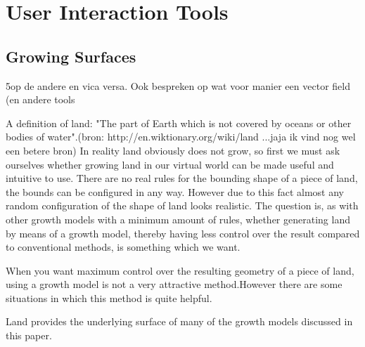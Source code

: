 \documentclass{article}
\newcommand{\inhoud}[1]{\textcolor{blue}{\textbf{\newline Summary: }\it{#1}}}
\begin{document}
\section{User Interaction Tools}

\subsection{Growing Surfaces}

5op de andere en vica versa. Ook bespreken op wat voor manier een vector field (en andere tools 


A definition of land: "The part of Earth which is not covered by oceans or other bodies of water".(bron: http://en.wiktionary.org/wiki/land ...jaja ik vind nog wel een betere bron)
In reality land obviously does not grow, so first we must ask ourselves whether growing land in our virtual world can be made useful and intuitive to use. There are no real rules for the bounding shape of a piece of land, the bounds can be configured in any way. However due to this fact almost any random configuration of the shape of land looks realistic. The question is, as with other growth models with a minimum amount of rules, whether generating land by means of a growth model, thereby having less control over the result compared to conventional methods, is something which we want. 

When you want maximum control over the resulting geometry of a piece of land, using a growth model is not a very attractive method.However there are some situations in which this method is quite helpful.


Land provides the underlying surface of many of the growth models discussed in this paper. 

\end{document}
